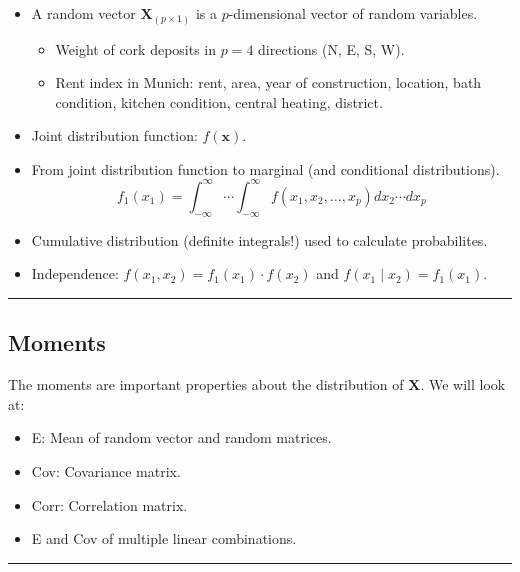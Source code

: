 \documentclass[]{article}
\providecommand{\tightlist}{%
  \setlength{\itemsep}{0pt}\setlength{\parskip}{0pt}}
\begin{document}
\begin{itemize}
\tightlist
\item
  A random vector \(\mathbf{X}_{(p\times 1)}\) is a \(p\)-dimensional
  vector of random variables.

  \begin{itemize}
  \tightlist
  \item
    Weight of cork deposits in \(p=4\) directions (N, E, S, W).
  \item
    Rent index in Munich: rent, area, year of construction, location,
    bath condition, kitchen condition, central heating, district.
  \end{itemize}
\item
  Joint distribution function: \(f(\mathbf{x})\).
\item
  From joint distribution function to marginal (and conditional
  distributions).
  \[f_1(x_1)=\int_{-\infty}^{\infty}\cdots \int_{-\infty}^{\infty} f(x_1,x_2,\ldots,x_p)dx_2 \cdots dx_p\]
\item
  Cumulative distribution (definite integrals!) used to calculate
  probabilites.
\item
  Independence: \(f(x_1,x_2)=f_1(x_1)\cdot f(x_2)\) and
  \(f(x_1\mid x_2)=f_1(x_1).\)
\end{itemize}

\begin{center}\rule{0.5\linewidth}{\linethickness}\end{center}

\hypertarget{moments}{%
\subsection{Moments}\label{moments}}

The moments are important properties about the distribution of
\(\mathbf{X}\). We will look at:

\begin{itemize}
\tightlist
\item
  E: Mean of random vector and random matrices.
\item
  Cov: Covariance matrix.
\item
  Corr: Correlation matrix.
\item
  E and Cov of multiple linear combinations.
\end{itemize}

\begin{center}\rule{0.5\linewidth}{\linethickness}\end{center}
\end{document}
